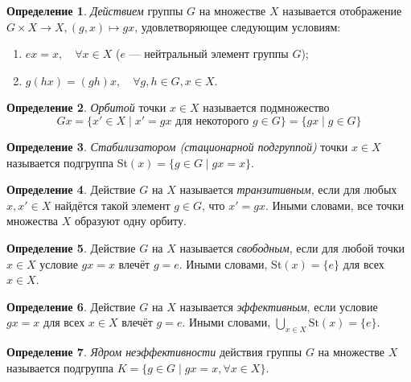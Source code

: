 \documentclass[a4paper]{article}
\theoremstyle{plain}
\theoremstyle{definition}
\newtheorem{definition}{Определение}
\numberwithin{definition}{section}
\numberwithin{proposal}{section}
\begin{document}
\begin{definition}
\emph{Действием} группы \(G\) на множестве \(X\) называется отображение \(G \times X \rightarrow X, (g, x) \mapsto gx\), удовлетворяющее следующим условиям:
\begin{enumerate}
	\item \(ex = x, \quad \forall x \in X\) (\(e\) --- нейтральный элемент группы \(G\));
	\item \(g(hx) = (gh)x, \quad \forall g,h \in G, x \in X\). 
\end{enumerate}
\end{definition}

\begin{definition}
\emph{Орбитой} точки \(x \in X\) называется подмножество
\begin{equation*}
	Gx = \{x' \in X \;|\; x' = gx \text{ для некоторого } g \in G\} = \{gx \;|\; g \in G\}
\end{equation*}
\end{definition}

\begin{definition}
\emph{Стабилизатором (стационарной подгруппой)} точки \(x \in X\) называется подгруппа St\((x) = \{g \in G \;|\; gx = x\}\).
\end{definition}

\begin{definition}
Действие \(G\) на \(X\) называется \emph{транзитивным}, если для любых \(x, x' \in X\) найдётся такой элемент \(g \in G\), что \(x' = gx\). Иными словами, все точки множества \(X\) образуют одну орбиту.
\end{definition}

\begin{definition}
Действие \(G\) на \(X\) называется \emph{свободным}, если для любой точки \(x \in X\) условие \(gx = x\) влечёт \(g = e\). Иными словами, St\((x) = \{e\}\) для всех \(x \in X\).
\end{definition}

\begin{definition}
Действие \(G\) на \(X\) называется \emph{эффективным}, если условие \(gx = x\) для всех \(x \in X\) влечёт \(g = e\). Иными словами, \(\bigcup_{x \in X} \mathrm{St}(x) = \{e\}\).
\end{definition}

\begin{definition}
\emph{Ядром неэффективности} действия группы \(G\) на множестве \(X\) называется подгруппа \(K = \{g \in G \;|\; gx = x, \forall x \in X\}\).
\end{definition}
\end{document}
